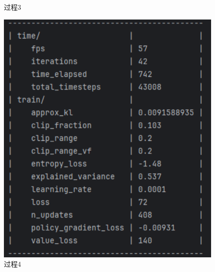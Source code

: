 \begin{figure}[H]
\begin{minipage}{0.24\textwidth}
        \caption{过程3}
    \end{minipage}%
    \begin{minipage}{0.24\textwidth}
        \centering
        \includegraphics[width=\textwidth]{images/training4.pdf}
        \caption{过程4}
    \end{minipage}
    
    \vspace{0.5cm}  
    

\end{figure}
